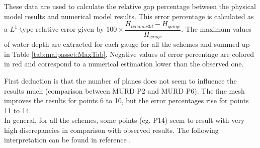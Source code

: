 These data are used to calculate the relative gap percentage between the physical model results and numerical model results. This error percentage is calculated as a $L^{1}$-type relative error given by $100 \times \dfrac{H_{telemac3d} - H_{gauge}}{H_{gauge}}$. The maximum values of water depth are extracted for each gauge for all the schemes and summed up in Table \ref{tab:malpasset:MaxTab}. Negative values of error percentage are colored in red and correspond to a numerical estimation lower than the observed one.
\begin{table}[H]
  \caption{Maximum values of water depth on measurement points for different schemes on the Malpasset case - relative errors}
      \label{tab:malpasset:MaxTab}
\end{table}

First deduction is that the number of planes does not seem to influence the results much (comparison between MURD P2 and MURD P6). The fine mesh improves the results for points 6 to 10, but the error percentages rise for points 11 to 14. \\

In general, for all the schemes, some points (eg. P14) seem to result with very high discrepancies in comparison with observed results. The following interpretation can be found in reference \cite{Hervouet2007}. \\

